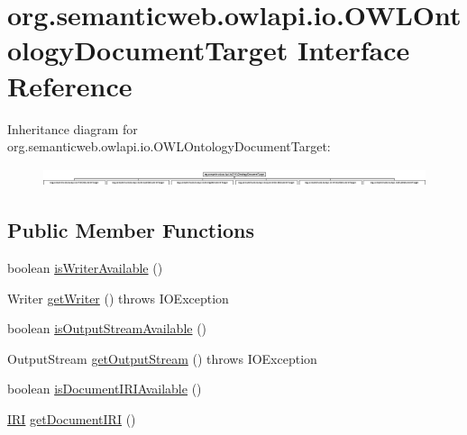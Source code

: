 \hypertarget{interfaceorg_1_1semanticweb_1_1owlapi_1_1io_1_1_o_w_l_ontology_document_target}{\section{org.\-semanticweb.\-owlapi.\-io.\-O\-W\-L\-Ontology\-Document\-Target Interface Reference}
\label{interfaceorg_1_1semanticweb_1_1owlapi_1_1io_1_1_o_w_l_ontology_document_target}
}
Inheritance diagram for org.\-semanticweb.\-owlapi.\-io.\-O\-W\-L\-Ontology\-Document\-Target\-:\begin{figure}[H]
\begin{center}
\leavevmode
\includegraphics[height=0.542636cm]{interfaceorg_1_1semanticweb_1_1owlapi_1_1io_1_1_o_w_l_ontology_document_target}
\end{center}
\end{figure}
\subsection*{Public Member Functions}
\begin{DoxyCompactItemize}
\item 
boolean \hyperlink{interfaceorg_1_1semanticweb_1_1owlapi_1_1io_1_1_o_w_l_ontology_document_target_a8a756838f860363829bd24a351f78aaf}{is\-Writer\-Available} ()
\item 
Writer \hyperlink{interfaceorg_1_1semanticweb_1_1owlapi_1_1io_1_1_o_w_l_ontology_document_target_a716924cb8a2bd0c6d7f6f8b50e46f316}{get\-Writer} ()  throws I\-O\-Exception
\item 
boolean \hyperlink{interfaceorg_1_1semanticweb_1_1owlapi_1_1io_1_1_o_w_l_ontology_document_target_a6d7b34b8a3bce5eb8eff8ab9151e811f}{is\-Output\-Stream\-Available} ()
\item 
Output\-Stream \hyperlink{interfaceorg_1_1semanticweb_1_1owlapi_1_1io_1_1_o_w_l_ontology_document_target_a3c793c1d620111a9f934e59f0133bc98}{get\-Output\-Stream} ()  throws I\-O\-Exception
\item 
boolean \hyperlink{interfaceorg_1_1semanticweb_1_1owlapi_1_1io_1_1_o_w_l_ontology_document_target_a9f7d6cc0b39983ed45e4a3466acb7bf7}{is\-Document\-I\-R\-I\-Available} ()
\item 
\hyperlink{classorg_1_1semanticweb_1_1owlapi_1_1model_1_1_i_r_i}{I\-R\-I} \hyperlink{interfaceorg_1_1semanticweb_1_1owlapi_1_1io_1_1_o_w_l_ontology_document_target_a42cfde0ea98e44e93f7c052a020c1665}{get\-Document\-I\-R\-I} ()
\end{DoxyCompactItemize}


